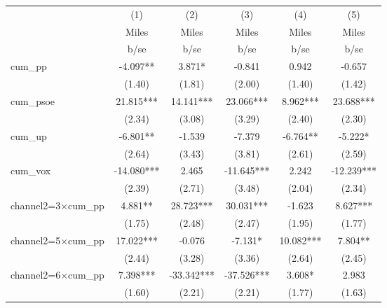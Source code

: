 \begin{tabular}{l*{5}{c}}
\toprule
                    &\multicolumn{1}{c}{(1)}&\multicolumn{1}{c}{(2)}&\multicolumn{1}{c}{(3)}&\multicolumn{1}{c}{(4)}&\multicolumn{1}{c}{(5)}\\
                    &\multicolumn{1}{c}{Miles}&\multicolumn{1}{c}{Miles}&\multicolumn{1}{c}{Miles}&\multicolumn{1}{c}{Miles}&\multicolumn{1}{c}{Miles}\\
                    &        b/se   &        b/se   &        b/se   &        b/se   &        b/se   \\
\midrule
cum\_pp              &      -4.097** &       3.871*  &      -0.841   &       0.942   &      -0.657   \\
                    &      (1.40)   &      (1.81)   &      (2.00)   &      (1.40)   &      (1.42)   \\
cum\_psoe            &      21.815***&      14.141***&      23.066***&       8.962***&      23.688***\\
                    &      (2.34)   &      (3.08)   &      (3.29)   &      (2.40)   &      (2.30)   \\
cum\_up              &      -6.801** &      -1.539   &      -7.379   &      -6.764** &      -5.222*  \\
                    &      (2.64)   &      (3.43)   &      (3.81)   &      (2.61)   &      (2.59)   \\
cum\_vox             &     -14.080***&       2.465   &     -11.645***&       2.242   &     -12.239***\\
                    &      (2.39)   &      (2.71)   &      (3.48)   &      (2.04)   &      (2.34)   \\
channel2=3$\times$cum\_pp&       4.881** &      28.723***&      30.031***&      -1.623   &       8.627***\\
                    &      (1.75)   &      (2.48)   &      (2.47)   &      (1.95)   &      (1.77)   \\
channel2=5$\times$cum\_pp&      17.022***&      -0.076   &      -7.131*  &      10.082***&       7.804** \\
                    &      (2.44)   &      (3.28)   &      (3.36)   &      (2.64)   &      (2.45)   \\
channel2=6$\times$cum\_pp&       7.398***&     -33.342***&     -37.526***&       3.608*  &       2.983   \\
                    &      (1.60)   &      (2.21)   &      (2.21)   &      (1.77)   &      (1.63)   \\

\end{tabular}
